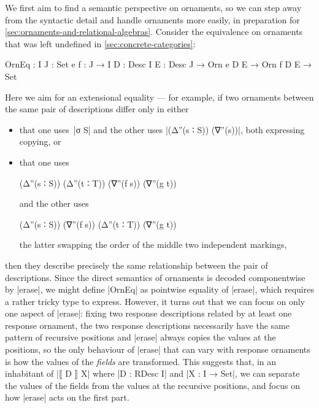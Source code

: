 We first aim to find a semantic perspective on ornaments, so we can step away from the syntactic detail and handle ornaments more easily, in preparation for \autoref{sec:ornaments-and-relational-algebras}.
Consider the equivalence on ornaments that was left undefined in \autoref{sec:concrete-categories}:
\begin{code}
OrnEq :  {I J : Set} {e f : J → I} {D : Desc I} {E : Desc J} →
         Orn e D E → Orn f D E → Set
\end{code}
Here we aim for an extensional equality --- for example, if two ornaments between the same pair of descriptions differ only in either
\begin{itemize}
\item that one uses~|σ S| and the other uses |(Δ''(s ∶ S)) (∇''(s))|, both expressing copying, or
\item that one uses
\begin{code}
(Δ''(s ∶ S)) (Δ''(t ∶ T)) (∇''(f s)) (∇''(g t))
\end{code}
and the other uses
\begin{code}
(Δ''(s ∶ S)) (∇''(f s)) (Δ''(t ∶ T)) (∇''(g t))
\end{code}
the latter swapping the order of the middle two independent markings,
\end{itemize}
then they describe precisely the same relationship between the pair of descriptions.
Since the direct semantics of ornaments is decoded componentwise by |erase|, we might define |OrnEq| as pointwise equality of |erase|, which requires a rather tricky type to express.
However, it turns out that we can focus on only one aspect of |erase|: fixing two response descriptions related by at least one response ornament, the two response descriptions necessarily have the same pattern of recursive positions and |erase| always copies the values at the positions, so the only behaviour of |erase| that can vary with response ornaments is how the values of the \emph{fields} are transformed.
This suggests that, in an inhabitant of |⟦ D ⟧ X| where |D : RDesc I| and |X : I → Set|, we can separate the values of the fields from the values at the recursive positions, and focus on how |erase| acts on the first part.


